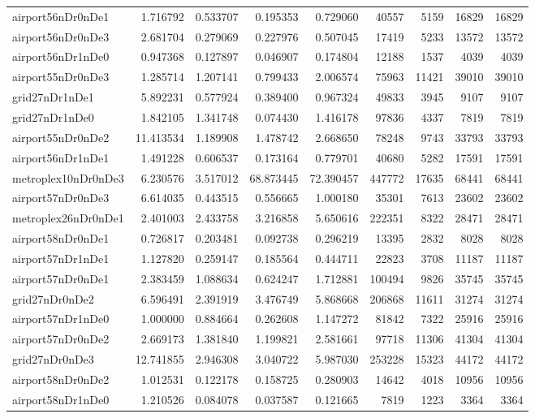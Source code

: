 \begin{longtable}{|l|r|r|r|r|r|r|r|r|}
airport56nDr0nDe1 & 1.716792 & 0.533707 & 0.195353 & 0.729060 & 40557 & 5159 & 16829 & 16829 \\
airport56nDr0nDe3 & 2.681704 & 0.279069 & 0.227976 & 0.507045 & 17419 & 5233 & 13572 & 13572 \\
airport56nDr1nDe0 & 0.947368 & 0.127897 & 0.046907 & 0.174804 & 12188 & 1537 & 4039 & 4039 \\
airport55nDr0nDe3 & 1.285714 & 1.207141 & 0.799433 & 2.006574 & 75963 & 11421 & 39010 & 39010 \\
grid27nDr1nDe1 & 5.892231 & 0.577924 & 0.389400 & 0.967324 & 49833 & 3945 & 9107 & 9107 \\
grid27nDr1nDe0 & 1.842105 & 1.341748 & 0.074430 & 1.416178 & 97836 & 4337 & 7819 & 7819 \\
airport55nDr0nDe2 & 11.413534 & 1.189908 & 1.478742 & 2.668650 & 78248 & 9743 & 33793 & 33793 \\
airport56nDr1nDe1 & 1.491228 & 0.606537 & 0.173164 & 0.779701 & 40680 & 5282 & 17591 & 17591 \\
metroplex10nDr0nDe3 & 6.230576 & 3.517012 & 68.873445 & 72.390457 & 447772 & 17635 & 68441 & 68441 \\
airport57nDr0nDe3 & 6.614035 & 0.443515 & 0.556665 & 1.000180 & 35301 & 7613 & 23602 & 23602 \\
metroplex26nDr0nDe1 & 2.401003 & 2.433758 & 3.216858 & 5.650616 & 222351 & 8322 & 28471 & 28471 \\
airport58nDr0nDe1 & 0.726817 & 0.203481 & 0.092738 & 0.296219 & 13395 & 2832 & 8028 & 8028 \\
airport57nDr1nDe1 & 1.127820 & 0.259147 & 0.185564 & 0.444711 & 22823 & 3708 & 11187 & 11187 \\
airport57nDr0nDe1 & 2.383459 & 1.088634 & 0.624247 & 1.712881 & 100494 & 9826 & 35745 & 35745 \\
grid27nDr0nDe2 & 6.596491 & 2.391919 & 3.476749 & 5.868668 & 206868 & 11611 & 31274 & 31274 \\
airport57nDr1nDe0 & 1.000000 & 0.884664 & 0.262608 & 1.147272 & 81842 & 7322 & 25916 & 25916 \\
airport57nDr0nDe2 & 2.669173 & 1.381840 & 1.199821 & 2.581661 & 97718 & 11306 & 41304 & 41304 \\
grid27nDr0nDe3 & 12.741855 & 2.946308 & 3.040722 & 5.987030 & 253228 & 15323 & 44172 & 44172 \\
airport58nDr0nDe2 & 1.012531 & 0.122178 & 0.158725 & 0.280903 & 14642 & 4018 & 10956 & 10956 \\
airport58nDr1nDe0 & 1.210526 & 0.084078 & 0.037587 & 0.121665 & 7819 & 1223 & 3364 & 3364 \\

\end{longtable}
